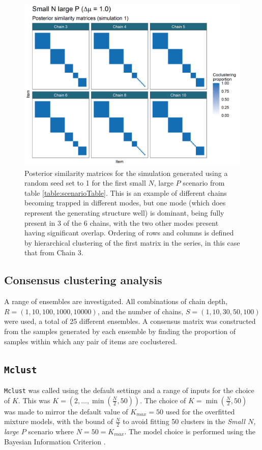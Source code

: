 \documentclass[]{article}
\begin{document}
\begin{figure} %
	\centering
	\includegraphics[scale=0.65]{./Images/Simulations/PSMs/small_n_large_p_baseSim1.png}
	\caption{Posterior similarity matrices for the simulation generated using a random seed set to 1 for the first small $N$, large $P$ scenario from table \ref{table:scenarioTable}. This is an example of different chains becoming trapped in different modes, but one mode (which does represent the generating structure well) is dominant, being fully present in 3 of the 6 chains, with the two other modes present having significant overlap. Ordering of rows and columns is defined by hierarchical clustering of the first matrix in the series, in this case that from Chain 3.}
	\label{fig:simPSMsDisagreeExample}
\end{figure}

\subsection{Consensus clustering analysis} 
A range of ensembles are investigated. All combinations of chain depth, $R=(1, 10, 100, 1000, 10000)$, and the number of chains, $S=(1, 10, 30, 50, 100)$ were used, a total of 25 different ensembles. A consensus matrix was constructed from the samples generated by each ensemble by finding the proportion of samples within which any pair of items are coclustered.

\subsection{\texttt{Mclust}}
\texttt{Mclust} was called using the default settings and a range of inputs for the choice of $K$. This was $K = (2, \ldots, \min(\frac{N}{2}, 50))$. The choice of $K=\min(\frac{N}{2}, 50)$ was made to mirror the default value of $K_{max}=50$ used for the overfitted mixture models, with the bound of $\frac{N}{2}$ to avoid fitting 50 clusters in the \emph{Small $N$, large $P$} scenario where $N=50=K_{max}$. The model choice is performed using the Bayesian Information Criterion \citep[][as implemented in \texttt{Mclust}]{schwarz1978estimating}.
\end{document}
